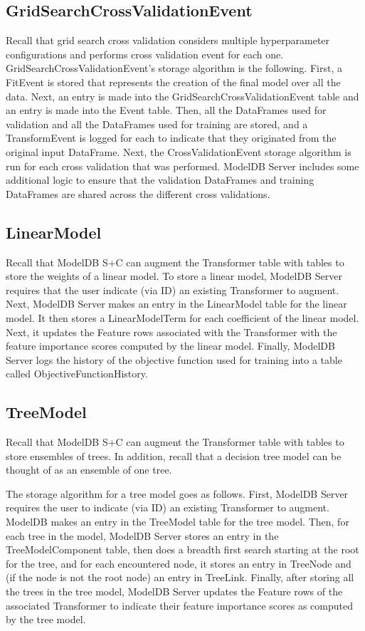 \subsection{GridSearchCrossValidationEvent}
Recall that grid search cross validation considers multiple hyperparameter configurations and
performs cross validation event for each one. GridSearchCrossValidationEvent's storage
algorithm is the following. First, a FitEvent is stored that represents the creation of
the final model over all the data. Next, an entry is made into the GridSearchCrossValidationEvent
table and an entry is made into the Event table. Then, all the DataFrames used for validation
and all the DataFrames used for training are stored, and a TransformEvent is logged for each to indicate
that they originated from the original input DataFrame. Next, the CrossValidationEvent storage algorithm
is run for each cross validation that was performed. ModelDB Server includes some additional logic to
ensure that the validation DataFrames and training DataFrames are shared across the different cross validations.

\subsection{LinearModel}
Recall that ModelDB S+C can augment the Transformer table with tables to store the
weights of a linear model. To store a linear model, ModelDB Server requires that the user
indicate (via ID) an existing Transformer to augment. Next, ModelDB Server makes an 
entry in the LinearModel table for the linear model. It then
stores a LinearModelTerm for each coefficient of the linear model. Next, it updates the Feature rows
associated with the Transformer with the feature importance scores computed by the linear model. Finally,
ModelDB Server logs the history of the objective function used for training into a table called ObjectiveFunctionHistory.

\subsection{TreeModel}
Recall that ModelDB S+C can augment the Transformer table with tables to store
ensembles of trees. In addition, recall that a decision tree model can be thought of
as an ensemble of one tree. 

The storage algorithm for a tree model goes as follows. First, ModelDB Server requires
the user to indicate (via ID) an existing Transformer to augment. ModelDB makes an entry in the TreeModel
table for the tree model. Then, for each tree in the model, ModelDB Server stores an entry in the TreeModelComponent table, 
then does a breadth first search starting
at the root for the tree, and for each encountered node, it stores an entry in TreeNode and (if the 
node is not the root node) an entry in TreeLink. Finally, after storing all the trees in the tree model, ModelDB Server
updates the Feature rows of the associated Transformer to indicate their feature importance scores as computed by the tree model.

